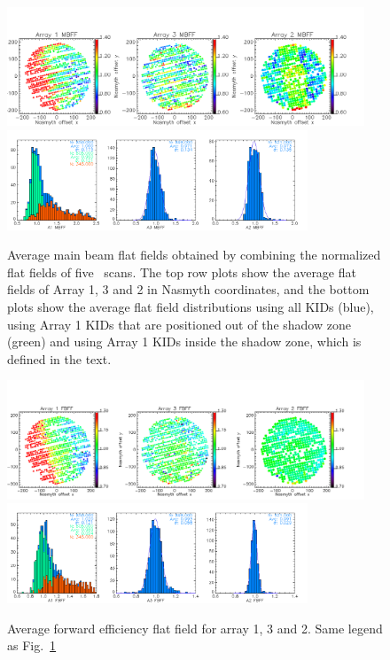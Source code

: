\begin{figure}[ht] 
\begin{center}
  \includegraphics[width=0.95\textwidth]{Figures/FlatFields/Average_main_beam_flat_field_N2R9_10.png}
  \includegraphics[width=0.8\textwidth]{Figures/FlatFields/Histo_average_main_beam_flat_field_N2R9_10.png}
\caption[Average main beam flat fields]{Average main beam flat fields
  obtained by combining the normalized flat fields of five
  \bm\ scans. The top row plots show the average flat fields of Array
  1, 3 and 2 in Nasmyth coordinates, and the bottom plots
  show the average flat field distributions using all KIDs (blue),
  using Array 1 KIDs that are positioned out of the shadow zone
  (green) and using Array 1 KIDs inside the shadow zone, which is
  defined in the text.}
 \label{fig:avg_mbff}
\end{center}
\end{figure}

\begin{figure}[ht] 
\begin{center}
  \includegraphics[width=0.95\textwidth]{Figures/FlatFields/Average_near_beam_flat_field_N2R9_10.png}
  \includegraphics[width=0.8\textwidth]{Figures/FlatFields/Histo_average_near_beam_flat_field_N2R9_10.png}
\caption[Average forward efficiency flat fields]{Average forward efficiency flat field for array 1, 3 and
  2. Same legend as Fig.~\ref{fig:avg_mbff}}
 \label{fig:avg_fbff}
\end{center}
\end{figure}

